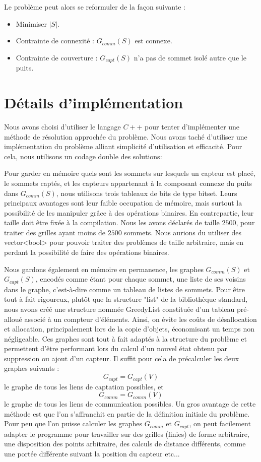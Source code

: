 \documentclass[12pt,a4paper]{article}
\begin{document}
Le problème peut alors se reformuler de la façon suivante :
\begin{itemize}
\item Minimiser $|S|$.
\item Contrainte de connexité : $G_{comm}(S)$ est connexe.
\item Contrainte de couverture : $G_{capt}(S)$ n'a pas de sommet isolé autre que le puits.
\end{itemize}
\section{Détails d'implémentation}
Nous avons choisi d'utiliser le langage $C++$ pour tenter d'implémenter une méthode de résolution approchée du problème. Nous avons taché d'utiliser une implémentation du problème alliant simplicité d'utilisation et efficacité. Pour cela, nous utilisons un codage double des solutions:

Pour garder en mémoire quels sont les sommets sur lesquels un capteur est placé, le sommets captés, et les capteurs appartenant à la composant connexe du puits dans $G_{comm}(S)$, nous utilisons trois tableaux de bits de type bitset. Leurs principaux avantages sont leur faible occupation de mémoire, mais surtout la possibilité de les manipuler grâce à des opérations binaires. En contrepartie, leur taille doit être fixée à la compilation. Nous les avons déclarés de taille $2500$, pour traiter des grilles ayant moins de $2500$ sommets. Nous aurions du utiliser des vector<bool> pour pouvoir traiter des problèmes de taille arbitraire, mais en perdant la possibilité de faire des opérations binaires.

Nous gardons également en mémoire en permanence, les graphes $G_{comm}(S)$ et $G_{capt}(S)$, encodés comme étant pour chaque sommet, une liste de ses voisins dans le graphe, c'est-à-dire comme un tableau de listes de sommets. Pour être tout à fait rigoureux, plutôt que la structure "list" de la bibliothèque standard, nous avons créé une structure nommée GreedyList constituée d'un tableau pré-alloué associé à un compteur d'éléments. Ainsi, on évite les coûts de désallocation et allocation, principalement lors de la copie d'objets, économisant un temps non négligeable. Ces graphes sont tout à fait  adaptés à la structure du problème et permettent d'être performant lors du calcul d'un nouvel état obtenu par suppression ou ajout d'un capteur. Il suffit pour cela de précalculer les deux graphes suivants : 
\[G_{capt}=G_{capt}(V)\]
 le graphe de tous les liens de captation possibles, et
\[G_{comm}=G_{comm}(V)\] 
le graphe de tous les liens de communication possibles. Un gros avantage de cette méthode est que l'on s'affranchit en partie de la définition initiale du problème. Pour peu que l'on puisse calculer les graphes $G_{comm}$ et $G_{capt}$, on peut facilement adapter le programme pour travailler sur des grilles (finies) de forme arbitraire, une disposition des points arbitraire, des calculs de distance différents, comme une portée différente suivant la position du capteur etc...
\end{document}
